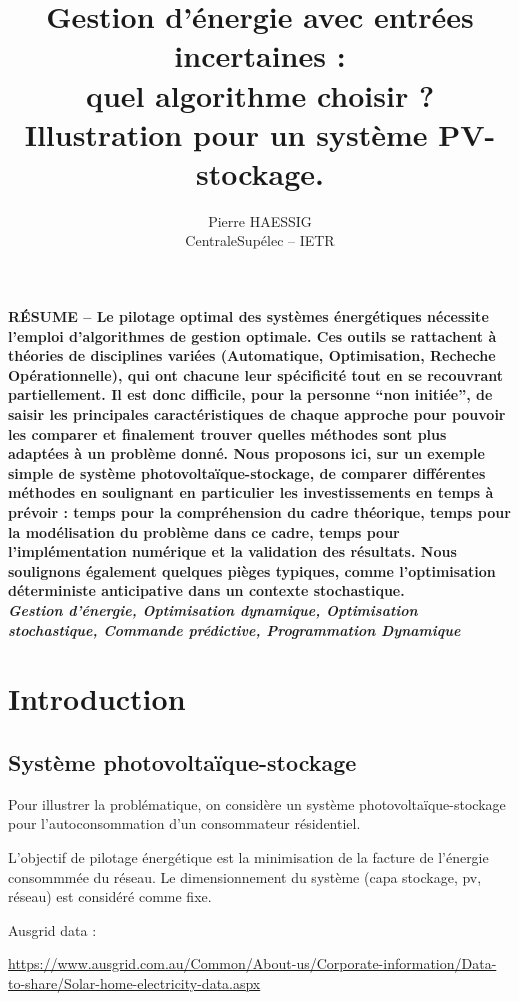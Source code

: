 \documentclass[a4paper,10pt,twocolumn]{article}
\title{
\fontsize{24pt}{24pt}\selectfont
Gestion d'énergie avec entrées incertaines : \\
quel algorithme choisir ?\\
Illustration pour un système PV-stockage.
}
\author{
\fontsize{11pt}{11pt}\selectfont
Pierre HAESSIG\tsp{*}\\
\fontsize{10pt}{10pt}\selectfont
\tsp{*}CentraleSupélec -- IETR
}
\date{}
\begin{document}
\maketitle
\thispagestyle{fancy}


\fontsize{9pt}{9pt}\selectfont
\textbf{RÉSUME --
Le pilotage optimal des systèmes énergétiques nécessite l'emploi d'algorithmes
de gestion optimale.
Ces outils se rattachent à théories de disciplines variées (Automatique, Optimisation, Recheche Opérationnelle),
qui ont chacune leur spécificité tout en se recouvrant partiellement.
%
Il est donc difficile, pour la personne ``non initiée'', de saisir les principales caractéristiques
de chaque approche pour pouvoir les comparer et finalement trouver
quelles méthodes sont plus adaptées à un problème donné.
%
Nous proposons ici, sur un exemple simple de système photovoltaïque-stockage, de
comparer différentes méthodes en soulignant en particulier les investissements
en temps à prévoir :
temps pour la compréhension du cadre théorique,
temps pour la modélisation du problème dans ce cadre,
temps pour l'implémentation numérique et la validation des résultats.
Nous soulignons également quelques pièges typiques, comme l'optimisation
déterministe anticipative dans un contexte stochastique.
}\\

\textbf{\textit{Gestion d'énergie, Optimisation dynamique, Optimisation stochastique,
Commande prédictive, Programmation Dynamique}}

\fontsize{10pt}{10pt}\selectfont


\section{Introduction}

\subsection{Système photovoltaïque-stockage}
Pour illustrer la problématique, on considère un système photovoltaïque-stockage
pour l'autoconsommation d'un consommateur résidentiel.

L'objectif de pilotage énergétique est la minimisation de la facture
de l'énergie consommmée du réseau. Le dimensionnement du système (capa stockage, pv, réseau) est considéré comme fixe.

Ausgrid data :

\url{https://www.ausgrid.com.au/Common/About-us/Corporate-information/Data-to-share/Solar-home-electricity-data.aspx}
\end{document}
